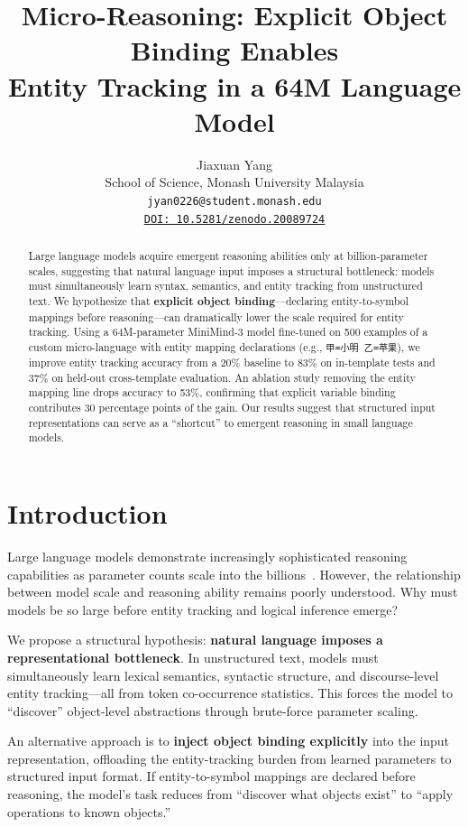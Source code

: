 \documentclass[11pt,a4paper]{article}
\title{Micro-Reasoning: Explicit Object Binding Enables \\ Entity Tracking in a 64M Language Model}
\author{Jiaxuan Yang \\
  School of Science, Monash University Malaysia \\
  \texttt{jyan0226@student.monash.edu} \\
  \texttt{\href{https://doi.org/10.5281/zenodo.20089724}{DOI: 10.5281/zenodo.20089724}}}
\date{}
\begin{document}
\maketitle

\begin{abstract}
Large language models acquire emergent reasoning abilities only at billion-parameter scales, suggesting that natural language input imposes a structural bottleneck: models must simultaneously learn syntax, semantics, and entity tracking from unstructured text.
We hypothesize that \textbf{explicit object binding}—declaring entity-to-symbol mappings before reasoning—can dramatically lower the scale required for entity tracking.
Using a 64M-parameter MiniMind-3 model fine-tuned on 500 examples of a custom micro-language with entity mapping declarations (e.g., \texttt{甲=小明 乙=苹果}), we improve entity tracking accuracy from a 20\% baseline to 83\% on in-template tests and 37\% on held-out cross-template evaluation.
An ablation study removing the entity mapping line drops accuracy to 53\%, confirming that explicit variable binding contributes 30 percentage points of the gain.
Our results suggest that structured input representations can serve as a ``shortcut'' to emergent reasoning in small language models.
\end{abstract}

\section{Introduction}

Large language models demonstrate increasingly sophisticated reasoning capabilities as parameter counts scale into the billions~\cite{wei2022chain, brown2020language}.
However, the relationship between model scale and reasoning ability remains poorly understood.
Why must models be so large before entity tracking and logical inference emerge?

We propose a structural hypothesis: \textbf{natural language imposes a representational bottleneck}.
In unstructured text, models must simultaneously learn lexical semantics, syntactic structure, and discourse-level entity tracking—all from token co-occurrence statistics.
This forces the model to ``discover'' object-level abstractions through brute-force parameter scaling.

An alternative approach is to \textbf{inject object binding explicitly} into the input representation, offloading the entity-tracking burden from learned parameters to structured input format.
If entity-to-symbol mappings are declared before reasoning, the model's task reduces from ``discover what objects exist'' to ``apply operations to known objects.''
\end{document}
